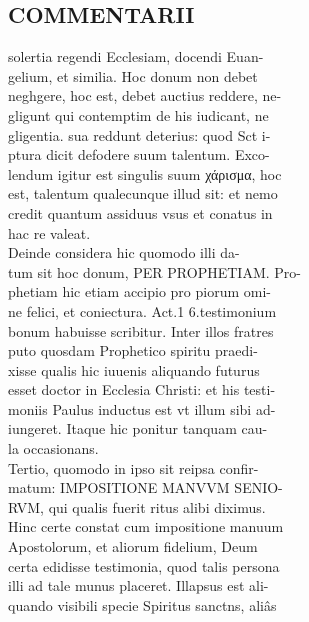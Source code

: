 \documentclass{article}
\begin{document}
\begin{pages}
\section*{COMMENTARII \\
                }solertia regendi Ecclesiam, docendi Euan- \\
                gelium, et similia. Hoc donum non debet \\
                neghgere, hoc est, debet auctius reddere, ne- \\
                gligunt qui contemptim de his iudicant, ne \\
                gligentia. sua reddunt deterius: quod Sct i- \\
                ptura dicit defodere suum talentum. Exco- \\
                lendum igitur est singulis suum χάρισμα, hoc \\
                est, talentum qualecunque illud sit: et nemo \\
                credit quantum assiduus vsus et conatus in \\
                hac re valeat. \\
                Deinde considera hic quomodo illi da- \\
                tum sit hoc donum, PER PROPHETIAM. Pro- \\
                phetiam hic etiam accipio pro piorum omi- \\
                ne felici, et coniectura. Act.1 6.testimonium \\
                bonum habuisse scribitur. Inter illos fratres \\
                puto quosdam Prophetico spiritu praedi- \\
                xisse qualis hic iuuenis aliquando futurus \\
                esset doctor in Ecclesia Christi: et his testi- \\
                moniis Paulus inductus est vt illum sibi ad- \\
                iungeret. Itaque hic ponitur tanquam cau- \\
                la occasionans. \\
                Tertio, quomodo in ipso sit reipsa confir- \\
                matum: IMPOSITIONE MANVVM SENIO- \\
                RVM, qui qualis fuerit ritus alibi diximus. \\
                Hinc certe constat cum impositione manuum \\
                Apostolorum, et aliorum fidelium, Deum \\
                certa edidisse testimonia, quod talis persona \\
                illi ad tale munus placeret. Illapsus est ali- \\
                quando visibili specie Spiritus sanctns, aliâs \\
                

\end{pages}
\end{document}
